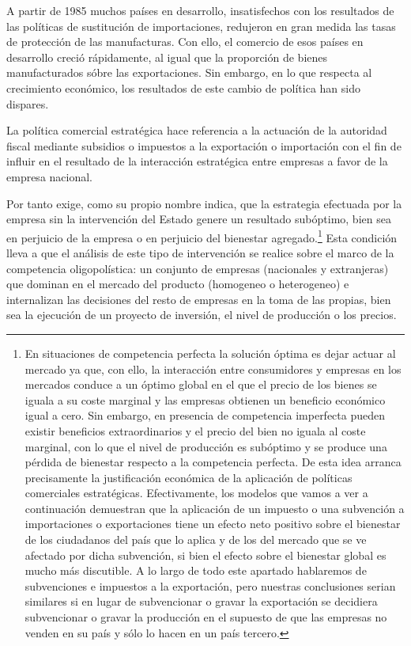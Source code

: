 \documentclass[10pt,a4paper]{article}
\begin{document}
{    A partir de 1985 muchos países en desarrollo, insatisfechos con los resultados de las políticas de sustitución de importaciones, redujeron en gran medida las tasas de protección de las manufacturas. Con ello, el comercio de esos países en desarrollo creció rápidamente, al igual que la proporción de bienes manufacturados sóbre las exportaciones. Sin embargo, en lo que respecta al crecimiento económico, los resultados de este cambio de política han sido dispares.
}

La política comercial estratégica hace referencia a la actuación de la autoridad fiscal mediante subsidios o impuestos a la exportación o importación con el fin de influir en el resultado de la interacción estratégica entre empresas a favor de la empresa nacional. 

Por tanto exige, como su propio nombre indica, que la estrategia efectuada por la empresa sin la intervención del Estado genere un resultado subóptimo, bien sea en perjuicio de la empresa o en perjuicio del bienestar agregado.\footnote{%
    En situaciones de competencia perfecta la solución óptima es dejar actuar al mercado ya que, con ello, la interacción entre consumidores y empresas en los mercados conduce a un óptimo global en el que el precio de los bienes se iguala a su coste marginal y las empresas obtienen un beneficio económico igual a cero. Sin embargo, en presencia de competencia imperfecta pueden existir beneficios extraordinarios y el precio del bien no iguala al coste marginal, con lo que el nivel de producción es subóptimo y se produce una pérdida de bienestar respecto a la competencia perfecta. De esta idea arranca precisamente la justificación económica de la aplicación de políticas comerciales estratégicas. Efectivamente, los modelos que vamos a ver a continuación demuestran que la aplicación de un impuesto o una subvención a importaciones o exportaciones tiene un efecto neto positivo sobre el bienestar de los ciudadanos del país que lo aplica y de los del mercado que se ve afectado por dicha subvención, si bien el efecto sobre el bienestar global es mucho más discutible. A lo largo de todo este apartado hablaremos de subvenciones e impuestos a la exportación, pero nuestras conclusiones serian similares si en lugar de subvencionar o gravar la exportación se decidiera subvencionar o gravar la producción en el supuesto de que las empresas no venden en su país y sólo lo hacen en un país tercero.
} Esta condición lleva a que el análisis de este tipo de intervención se realice sobre el marco de la competencia oligopolística: un conjunto de empresas (nacionales y extranjeras) que dominan en el mercado del producto (homogeneo o heterogeneo) e internalizan las decisiones del resto de empresas en la toma de las propias, bien sea la ejecución de un proyecto de inversión, el nivel de producción o los precios. 
\end{document}
